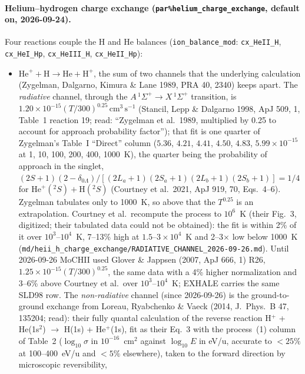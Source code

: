 \documentclass[english,a4paper]{my_memo}
\newcommand{\code}[1]{\texttt{#1}}
\newcommand{\cmc}{\mathrm{cm^{3}\,s^{-1}}}
\begin{document}
\paragraph{Helium--hydrogen charge exchange (\code{par\%helium\_charge\_exchange},
default on, 2026-09-24).}  Four reactions couple the H and He balances
(\code{ion\_balance\_mod}: \code{cx\_HeII\_H}, \code{cx\_HeI\_Hp},
\code{cx\_HeIII\_H}, \code{cx\_HeII\_Hp}):
\begin{itemize}
\item $\mathrm{He}^+ + \mathrm{H} \to \mathrm{He} + \mathrm{H}^+$, the sum of
  two channels that the underlying calculation (Zygelman, Dalgarno, Kimura
  \& Lane 1989, PRA 40, 2340) keeps apart.  The \emph{radiative} channel,
  through the $A\,^1\Sigma^+ \to X\,^1\Sigma^+$ transition, is
  $1.20{\times}10^{-15}(T/300)^{0.25}\,\cmc$ (Stancil, Lepp \& Dalgarno
  1998, ApJ 509, 1, Table~1 reaction 19; read: ``Zygelman et al.\ 1989,
  multiplied by 0.25 to account for approach probability factor''); that fit is one quarter of
  Zygelman's Table~I ``Direct'' column ($5.36$, $4.21$, $4.41$, $4.50$,
  $4.83$, $5.99{\times}10^{-15}$ at 1, 10, 100, 200, 400, 1000~K), the
  quarter being the probability of approach in the singlet,
  $(2S+1)(2-\delta_{0\Lambda})/[(2L_a+1)(2S_a+1)(2L_b+1)(2S_b+1)] = 1/4$
  for $\mathrm{He}^+(^2S) + \mathrm{H}(^2S)$ (Courtney et al.\ 2021, ApJ 919,
  70, Eqs.~4--6).  Zygelman tabulates only to 1000~K, so above that the
  $T^{0.25}$ is an extrapolation.  Courtney et al.\ recompute the process to
  $10^6$~K (their Fig.~3, digitized; their tabulated data could not be
  obtained): the fit is within 2\% of it over $10^3$--$10^4$~K, 7--13\% high
  at $1.5$--$3\times10^4$~K and 2--3$\times$ low below 1000~K
  (\code{md/heii\_h\_charge\_exchange/RADIATIVE\_CHANNEL\_2026-09-26.md}).
  Until 2026-09-26 MoCHII used Glover \& Jappsen (2007, ApJ 666, 1) R26,
  $1.25{\times}10^{-15}(T/300)^{0.25}$, the same data with a 4\% higher
  normalization and 3--6\% above Courtney et al.\ over $10^3$--$10^4$~K;
  EXHALE carries the same SLD98 row.  The \emph{non-radiative} channel (since
  2026-09-26) is the ground-to-ground exchange from Loreau, Ryabchenko \&
  Vaeck (2014, J.\ Phys.\ B 47, 135204; read): their fully quantal
  calculation of the reverse reaction H$^+$ + He(1s$^2$) $\to$ H(1s) +
  He$^+$(1s), fit as their Eq.~3 with the process~(1) column of Table~2
  ($\log_{10}\sigma$ in $10^{-16}$~cm$^2$ against $\log_{10}E$ in eV/u,
  accurate to $<25\%$ at 100--400~eV/u and $<5\%$ elsewhere), taken to the
  forward direction by microscopic reversibility,

\end{itemize}
\end{document}
